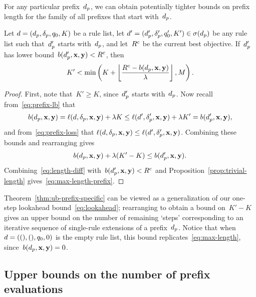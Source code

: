 For any particular prefix~$d_p$, we can obtain potentially tighter bounds on
prefix length for the family of all prefixes that start with~$d_p$.

\begin{theorem}
\label{thm:ub-prefix-specific}
Let ${{d} = (d_p, \delta_p, q_0, K)}$ be a rule list, let
${{d}' = (d_p', \delta_p', q_0', K') \in \sigma(d_p)}$
be any rule list such that~$d_p'$ starts with~$d_p$,
and let~${R^c}$ be the current best objective.
%
If~$d_p'$ has lower bound~${b(d_p', \mathbf{x}, \mathbf{y}) < {R^c}}$, then
\begin{align}
K' < \min \left( K + \left\lfloor \frac{\CurrentObj - b(\Prefix, \x, \y)}{\Reg} \right\rfloor, M \right).
\label{eq:max-length-prefix}
\end{align}
\end{theorem}

\begin{proof}
First, note that~${K' \ge K}$, since~$d_p'$ starts with~$d_p$.
%
Now recall from~\eqref{eq:prefix-lb} that
%
\begin{align}
b(\Prefix, \x, \y) = \Loss(\RL, \Labels, \x, \y) + \Reg K
\le \Loss(\RL', \Labels', \x, \y) + \Reg K' = b(\Prefix', \x, \y),
\end{align}
%
and from~\eqref{eq:prefix-loss} that
${\ell({d}, \delta_p, \mathbf{x}, \mathbf{y}) \le \ell({d}', \delta_p', \mathbf{x}, \mathbf{y})}$.
%
Combining these bounds and rearranging gives
\begin{align}
b(\Prefix, \x, \y) + \Reg (K' - K) \le b(\Prefix', \x, \y).
\label{eq:length-diff}
\end{align}
Combining~\eqref{eq:length-diff} with~${b(d_p', \mathbf{x}, \mathbf{y}) < {R^c}}$
and Proposition~\ref{prop:trivial-length} gives~\eqref{eq:max-length-prefix}.
\end{proof}

Theorem~\ref{thm:ub-prefix-specific} can be viewed as a generalization
of our one-step lookahead bound~\eqref{eq:lookahead};
rearranging to obtain a bound on~${K' - K}$
gives an upper bound on the number of remaining `steps' corresponding
to an iterative sequence of single-rule extensions of a prefix~$d_p$.
%
Notice that when~${{d} = ((), (), q_0, 0)}$ is the empty rule list,
this bound replicates~\eqref{eq:max-length}, since~${b(d_p, \mathbf{x}, \mathbf{y}) = 0}$.

\subsection{Upper bounds on the number of prefix evaluations}
\label{sec:ub-size}

